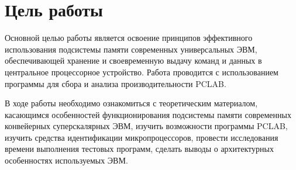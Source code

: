 \setcounter{page}{2}

\chapter*{Цель работы}


Основной целью работы является освоение принципов эффективного использования подсистемы памяти современных универсальных ЭВМ, обеспечивающей хранение и своевременную выдачу команд и данных в центральное процессорное устройство. Работа проводится с использованием программы для сбора и анализа производительности PCLAB.

В ходе работы необходимо ознакомиться с теоретическим материалом, касающимся особенностей функционирования подсистемы памяти современных конвейерных суперскалярных ЭВМ, изучить возможности программы PCLAB, изучить средства идентификации микропроцессоров, провести исследования времени выполнения тестовых программ, сделать выводы о архитектурных особенностях используемых ЭВМ.


